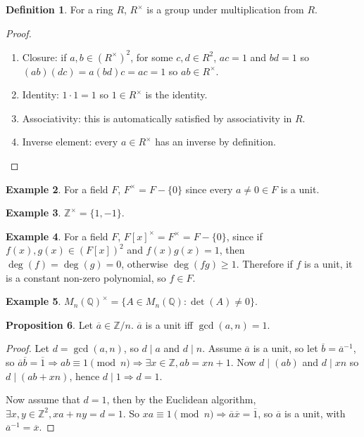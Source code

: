 \documentclass[12pt,a4paper]{article}
\theoremstyle{definition}
\newtheorem{definition}{Definition}[subsection]
\newtheorem{proposition}[definition]{Proposition}
\newtheorem{example}[definition]{Example}
\begin{document}
\begin{definition}
	For a ring $R$, $R^{\times}$ is a group under multiplication from $R$.
\end{definition}

\begin{proof}
	\hfill
	\begin{enumerate}
		\item Closure: if $a, b \in {(R^{\times})}^2$, for some $c, d \in R^2$, $ac = 1$ and $bd = 1$ so $(ab)(dc) = a(bd)c = ac = 1$ so $ab \in R^{\times}$.
		\item Identity: $1 \cdot 1 = 1$ so $1 \in R^{\times}$ is the identity.
		\item Associativity: this is automatically satisfied by associativity in $R$.
		\item Inverse element: every $a \in R^{\times}$ has an inverse by definition.
	\end{enumerate}
\end{proof}

\begin{example}
	For a field $F$, $F^{\times} = F - \{ 0 \}$ since every $a \ne 0 \in F$ is a unit.
\end{example}

\begin{example}
	$\mathbb{Z}^{\times} = \{ 1, -1 \}$.
\end{example}

\begin{example}\label{exa:constantPolynomialUnitInField}
	For a field $F$, ${F[x]}^{\times} = F^{\times} = F - \{ 0 \}$, since if $f(x), g(x) \in {(F[x])}^2$ and $f(x) g(x) = 1$, then $\deg(f) = \deg(g) = 0$, otherwise $\deg(f g) \ge 1$. Therefore if $f$ is a unit, it is a constant non-zero polynomial, so $f \in F$.
\end{example}

\begin{example}
	${M_n(\mathbb{Q})}^{\times} = \{ A \in M_n(\mathbb{Q}): \det(A) \ne 0 \}$.
\end{example}

\begin{proposition}\label{prop:unitCoPrimeEquivalence}
	Let $\overline{a} \in \mathbb{Z} / n$. $\overline{a}$ is a unit iff $\gcd(a, n) = 1$.
\end{proposition}

\begin{proof}
	Let $d = \gcd(a, n)$, so $d \mid a$ and $d \mid n$. Assume $\overline{a}$ is a unit, so let $\overline{b} = \overline{a}^{-1}$, so $\overline{a} \overline{b} = \overline{1} \Rightarrow ab \equiv 1 \pmod{n} \Rightarrow \exists x \in \mathbb{Z}, ab = xn + 1$. Now $d \mid (ab)$ and $d \mid xn$ so $d \mid (ab + xn)$, hence $d \mid 1 \Rightarrow d = 1$.

	Now assume that $d = 1$, then by the Euclidean algorithm, $\exists x, y \in \mathbb{Z}^2, xa + ny = d = 1$. So $xa \equiv 1 \pmod{n} \Rightarrow \overline{a} \overline{x} = \overline{1}$, so $\overline{a}$ is a unit, with $\overline{a}^{-1} = \overline{x}$.
\end{proof}
\end{document}
